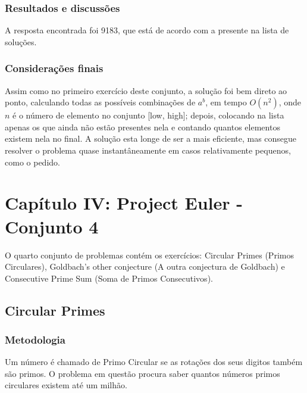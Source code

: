 \documentclass{article}
\begin{document}
        \subsubsection{Resultados e discussões}
        A resposta encontrada foi 9183, que está de acordo com a presente na lista de soluções.
        
        \subsubsection{Considerações finais}
        Assim como no primeiro exercício deste conjunto, a solução foi bem direto ao ponto, calculando todas as possíveis combinações de $a^b$, em tempo $O(n^2)$, onde $n$ é o número de elemento no conjunto [low, high]; depois, colocando na lista apenas os que ainda não estão presentes nela e contando quantos elementos existem nela no final. A solução esta longe de ser a mais eficiente, mas consegue resolver o problema quase instantâneamente em casos relativamente pequenos, como o pedido.

\section{Capítulo IV: Project Euler - Conjunto 4}
O quarto conjunto de problemas contém os exercícios: Circular Primes (Primos Circulares), Goldbach's other conjecture (A outra conjectura de Goldbach) e Consecutive Prime Sum (Soma de Primos Consecutivos).
    
    \subsection{Circular Primes}
        
        \subsubsection{Metodologia}
        Um número é chamado de Primo Circular se as rotações dos seus digitos também são primos. O problema em questão procura saber quantos números primos circulares existem até um milhão.
        
\end{document}
